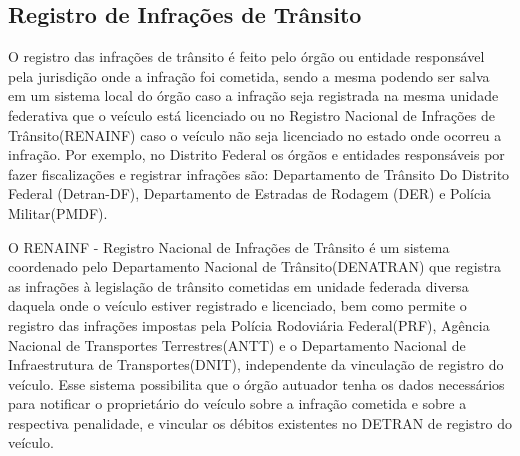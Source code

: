 \subsection{Registro de Infrações de Trânsito}
\label{section_renainf}


    O registro das infrações de trânsito é feito pelo órgão ou entidade responsável pela jurisdição onde a infração foi cometida, sendo a mesma podendo ser salva em um sistema local do órgão caso a infração seja registrada na mesma unidade federativa que o veículo está licenciado ou no Registro Nacional de Infrações de Trânsito(RENAINF) caso o veículo não seja licenciado no estado onde ocorreu a infração. Por exemplo, no Distrito Federal os órgãos e entidades responsáveis por fazer fiscalizações e registrar infrações são: Departamento de Trânsito Do Distrito Federal (Detran-DF), Departamento de Estradas de Rodagem (DER) e Polícia Militar(PMDF).
    
    O RENAINF - Registro Nacional de Infrações de Trânsito é um sistema coordenado pelo Departamento Nacional de Trânsito(DENATRAN) que registra as infrações à legislação de trânsito cometidas em unidade federada diversa daquela onde o veículo estiver registrado e licenciado, bem como permite o registro das infrações impostas pela Polícia Rodoviária Federal(PRF), Agência Nacional de Transportes Terrestres(ANTT) e o Departamento Nacional de Infraestrutura de Transportes(DNIT), independente da vinculação de registro do veículo. Esse sistema possibilita que o órgão autuador tenha os dados necessários para notificar o proprietário do veículo sobre a infração cometida e sobre a respectiva penalidade, e vincular os débitos existentes no DETRAN de registro do veículo.\cite{renainf_fazenda_sp}

